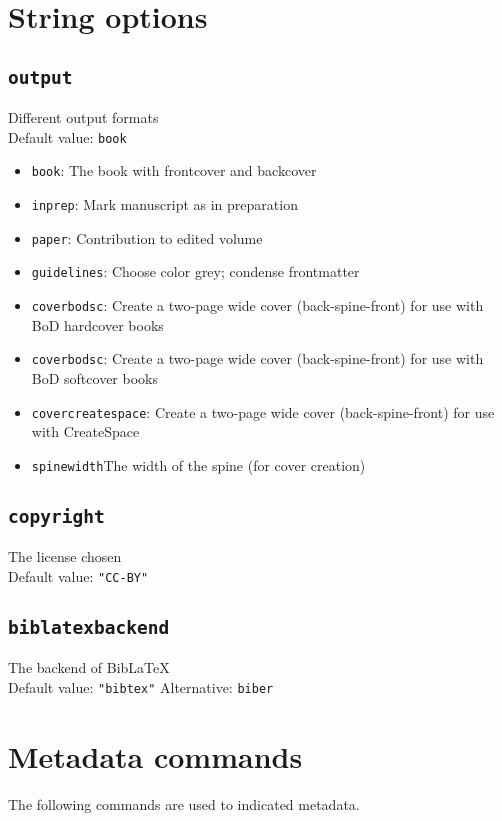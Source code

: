 \documentclass[%
output=guidelines,
guidelines]{../langscibook}
\newcommand{\option}[3]{\subsection{\texttt{#1}}{#2}\\Default value: {\texttt{#3}}}
\begin{document}
\section{String options} 
\option{output}{Different output formats}{book}
\begin{itemize}
\item \texttt{book}: The book with frontcover and backcover 
\item \texttt{inprep}: Mark manuscript as in preparation
\item \texttt{paper}: Contribution to edited volume
\item \texttt{guidelines}: Choose color grey; condense frontmatter
\item \texttt{coverbodsc}: Create a two-page wide cover  (back-spine-front) for use with BoD hardcover books
\item \texttt{coverbodsc}: Create a two-page wide cover  (back-spine-front) for use with BoD softcover books
\item \texttt{covercreatespace}: Create a two-page wide cover  (back-spine-front) for use with CreateSpace 
\item \texttt{spinewidth}{The width of the spine (for cover creation)}
\end{itemize}
\option{copyright}{The license chosen}{"CC-BY"}
\option{biblatexbackend}{The backend of BibLaTeX}{"bibtex"}
Alternative: \texttt{biber}




\section{Metadata commands}\label{sec:metadatacommands}
The following commands are used to indicated metadata.  
\end{document}
